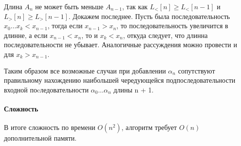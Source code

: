 \documentclass[12pt]{article}
\begin{document}
Длина $ A_n $ не может быть меньше $ A_{n - 1} $, так как $ L_<[n] \ge L_<[n - 1] $ и $ L_>[n] \ge L_>[n - 1] $. 
Докажем последнее. Пусть была последовательность $ x_0 \dots x_k < x_{n - 1}$, тогда если $ x_{n - 1} > x_{n} $,
то последовательность увеличится в длинне, а если $ x_{n - 1} < x_n $, то и $ x_k < x_n $, откуда следует, что
длинна последовательности не убывает. Аналогичные рассуждения можно провести и для $ x_k > x_{n - 1} $.

Таким образом все возможные случаи при добавлении $ \alpha_n $ сопутствуют правильному нахождению
наибольшей чередующейся подпоследовательности входной поcледовательности $ \alpha_0 \dots \alpha_n $ длины n + 1.




\paragraph{Сложность}
В итоге сложность по времени $ O(n^2) $, алгоритм требует $ O(n) $ дополнительной памяти.
\end{document}
